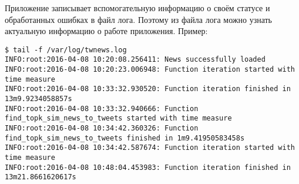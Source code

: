        Приложение записывает вспомогательную информацию о своём статусе и обработанных ошибках в файл лога.
        Поэтому из файла лога можно узнать актуальную информацию о работе приложения. Пример:
        \begin{lstlisting}
$ tail -f /var/log/twnews.log
INFO:root:2016-04-08 10:20:08.256411: News successfully loaded
INFO:root:2016-04-08 10:20:23.006948: Function iteration started with time measure
INFO:root:2016-04-08 10:33:32.930520: Function iteration finished in 13m9.9234058857s
INFO:root:2016-04-08 10:33:32.940666: Function find_topk_sim_news_to_tweets started with time measure
INFO:root:2016-04-08 10:34:42.360326: Function find_topk_sim_news_to_tweets finished in 1m9.41950583458s
INFO:root:2016-04-08 10:34:42.587674: Function iteration started with time measure
INFO:root:2016-04-08 10:48:04.453983: Function iteration finished in 13m21.8661620617s
        \end{lstlisting}